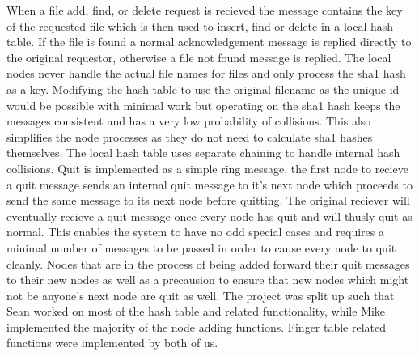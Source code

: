 When a file add, find, or delete request is recieved the message contains the key of the requested file which is then used to insert, find or delete in a local hash table. If the file is found a normal acknowledgement message is replied directly to the original requestor, otherwise a file not found message is replied. The local nodes never handle the actual file names for files and only process the sha1 hash as a key. Modifying the hash table to use the original filename as the unique id would be possible with minimal work but operating on the sha1 hash keeps the messages consistent and has a very low probability of collisions. This also simplifies the node processes as they do not need to calculate sha1 hashes themselves. The local hash table uses separate chaining to handle internal hash collisions.
Quit is implemented as a simple ring message, the first node to recieve a quit message sends an internal quit message to it's next node which proceeds to send the same message to its next node before quitting. The original reciever will eventually recieve a quit message once every node has quit and will thusly quit as normal. This enables the system to have no odd special cases and requires a minimal number of messages to be passed in order to cause every node to quit cleanly. Nodes that are in the process of being added forward their quit messages to their new nodes as well as a precausion to ensure that new nodes which might not be anyone's next node are quit as well.
The project was split up such that Sean worked on most of the hash table and related functionality, while Mike implemented the majority of the node adding functions. Finger table related functions were implemented by both of us.
